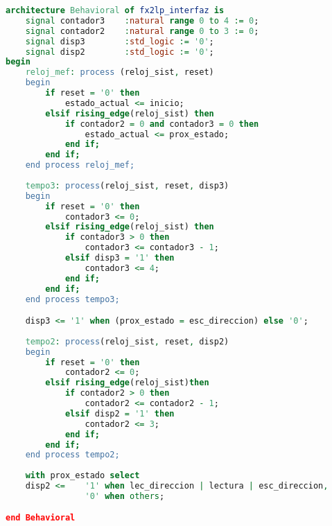 \begin{lstlisting}[language=VHDL,backgroundcolor=\color{gray!30}]
architecture Behavioral of fx2lp_interfaz is
	signal contador3	:natural range 0 to 4 := 0;
	signal contador2	:natural range 0 to 3 := 0;
	signal disp3		:std_logic := '0';
	signal disp2		:std_logic := '0';
begin
	reloj_mef: process (reloj_sist, reset)
	begin
		if reset = '0' then
			estado_actual <= inicio;
		elsif rising_edge(reloj_sist) then
			if contador2 = 0 and contador3 = 0 then
				estado_actual <= prox_estado;
			end if;
		end if;
	end process reloj_mef;
	
	tempo3: process(reloj_sist, reset, disp3)
	begin
		if reset = '0' then
			contador3 <= 0;
		elsif rising_edge(reloj_sist) then
			if contador3 > 0 then
				contador3 <= contador3 - 1;
			elsif disp3 = '1' then
				contador3 <= 4;
			end if;
		end if;
	end process tempo3;

	disp3 <= '1' when (prox_estado = esc_direccion) else '0';
	
	tempo2: process(reloj_sist, reset, disp2)
	begin
		if reset = '0' then
			contador2 <= 0;
		elsif rising_edge(reloj_sist)then
			if contador2 > 0 then
				contador2 <= contador2 - 1;
			elsif disp2 = '1' then
				contador2 <= 3;
			end if;
		end if;
	end process tempo2;
	
	with prox_estado select
	disp2 <=	'1' when lec_direccion | lectura | esc_direccion,
				'0' when others;

end Behavioral
\end{lstlisting}
